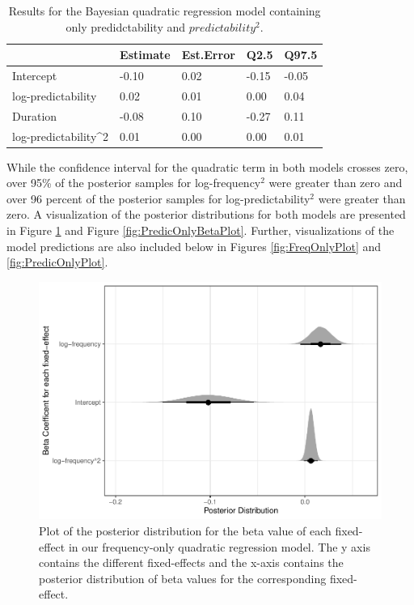 \documentclass[
  man,floatsintext]{apa6}
\begin{document}
\begin{table}[H]

\begin{center}
\begin{threeparttable}

\caption{\label{tab:brmsPredic}Results for the Bayesian quadratic regression model containing only predidctability and \(predictability^2\).}

\begin{tabular}{lllll}
\toprule
 & \multicolumn{1}{c}{Estimate} & \multicolumn{1}{c}{Est.Error} & \multicolumn{1}{c}{Q2.5} & \multicolumn{1}{c}{Q97.5}\\
\midrule
Intercept & -0.10 & 0.02 & -0.15 & -0.05\\
log-predictability & 0.02 & 0.01 & 0.00 & 0.04\\
Duration & -0.08 & 0.10 & -0.27 & 0.11\\
log-predictability\textasciicircum{}2 & 0.01 & 0.00 & 0.00 & 0.01\\
\bottomrule
\end{tabular}

\end{threeparttable}
\end{center}

\end{table}

While the confidence interval for the quadratic term in both models crosses zero, over 95\% of the posterior samples for log-frequency\(^2\) were greater than zero and over 96 percent of the posterior samples for log-predictability\(^2\) were greater than zero. A visualization of the posterior distributions for both models are presented in Figure \ref{fig:FreqOnlyBetaPlot} and Figure \ref{fig:PredicOnlyBetaPlot}. Further, visualizations of the model predictions are also included below in Figures \ref{fig:FreqOnlyPlot} and \ref{fig:PredicOnlyPlot}.

\begin{figure}

{\centering \includegraphics[width=0.8\linewidth]{write-up_files/figure-latex/FreqOnlyBetaPlot-1} 

}

\caption{Plot of the posterior distribution for the beta value of each fixed-effect in our frequency-only quadratic regression model. The y axis contains the different fixed-effects and the x-axis contains the posterior distribution of beta values for the corresponding fixed-effect.}\label{fig:FreqOnlyBetaPlot}
\end{figure}
\end{document}
